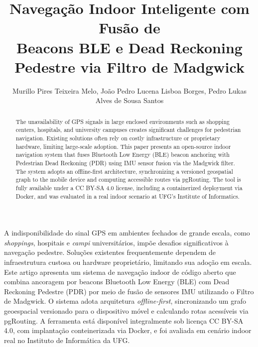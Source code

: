 \documentclass[12pt]{article}
\title{Navegação Indoor Inteligente com Fusão de\\
       Beacons BLE e Dead Reckoning Pedestre via Filtro de Madgwick}
\author{
  Murillo Pires Teixeira Melo\inst{1},
  João Pedro Lucena Lisboa Borges\inst{1},
  Pedro Lukas Alves de Sousa Santos\inst{1}
}
\begin{document}
\maketitle

\begin{abstract}
The unavailability of GPS signals in large enclosed environments such as shopping
centers, hospitals, and university campuses creates significant challenges for
pedestrian navigation. Existing solutions often rely on costly infrastructure or
proprietary hardware, limiting large-scale adoption. This paper presents an
open-source indoor navigation system that fuses Bluetooth Low Energy (BLE) beacon
anchoring with Pedestrian Dead Reckoning (PDR) using IMU sensor fusion via the
Madgwick filter. The system adopts an offline-first architecture, synchronizing
a versioned geospatial graph to the mobile device and computing accessible routes
via pgRouting. The tool is fully available under a CC BY-SA 4.0 license, including
a containerized deployment via Docker, and was evaluated in a real indoor scenario
at UFG's Institute of Informatics.
\end{abstract}

\begin{resumo}
A indisponibilidade do sinal GPS em ambientes fechados de grande escala, como
\textit{shoppings}, hospitais e \textit{campi} universitários, impõe desafios
significativos à navegação pedestre. Soluções existentes frequentemente dependem
de infraestrutura custosa ou hardware proprietário, limitando sua adoção em escala.
Este artigo apresenta um sistema de navegação indoor de código aberto que combina
ancoragem por beacons Bluetooth Low Energy (BLE) com Dead Reckoning Pedestre (PDR)
por meio de fusão de sensores IMU utilizando o Filtro de Madgwick. O sistema adota
arquitetura \textit{offline-first}, sincronizando um grafo geoespacial versionado
para o dispositivo móvel e calculando rotas acessíveis via pgRouting. A ferramenta
está disponível integralmente sob licença CC BY-SA 4.0, com implantação conteinerizada
via Docker, e foi avaliada em cenário indoor real no Instituto de Informática da UFG.
\end{resumo}

\end{document}

